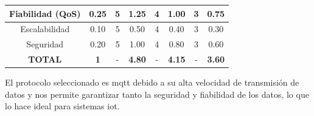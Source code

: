 \begin{tabla}[red]
{\begin{tabular}{|c|c|c|c|c|c|c|c|}
\hline
\rowcolor[rgb]{0.027,0.894,0.675} Fiabilidad (QoS)                                                        & 0.25                                                                       & 5               & 1.25                 & 4               & 1.00                  & 3               & 0.75                  \\ 
\hline
Escalabilidad                                                                                             & 0.10                                                                       & 5               & 0.50                 & 4               & 0.40                  & 3               & 0.30                  \\ 
\hline
\rowcolor[rgb]{0.027,0.894,0.675} Seguridad                                                               & 0.20                                                                       & 5               & 1.00                 & 4               & 0.80                  & 3               & 0.60                  \\ 
\hline
\textbf{TOTAL}                                                                                            & \textbf{1}                                                                 & -               & \textbf{4.80}        & -               & \textbf{4.15}         & -               & \textbf{3.60}         \\
\hline
\end{tabular}
}
\end{tabla}
El protocolo seleccionado es \acrshort{mqtt} debido a su alta velocidad de transmisión de datos y nos permite garantizar tanto la seguridad y fiabilidad de los datos, lo que lo hace ideal para sistemas \acrshort{iot}.

